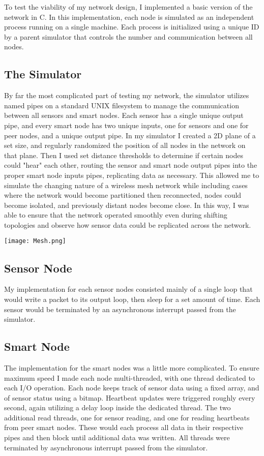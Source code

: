 \documentclass{article}
\begin{document}
To test the viability of my network design, I implemented a basic version of the network in C. In this implementation, each node is simulated as an independent process running on a single machine. Each process is initialized using a unique ID by a parent simulator that controls the number and communication between all nodes.

\subsection{The Simulator}

By far the most complicated part of testing my network, the simulator utilizes named pipes on a standard UNIX filesystem to manage the communication between all sensors and smart nodes. Each sensor has a single unique output pipe, and every smart node has two unique inputs, one for sensors and one for peer nodes, and a unique output pipe. In my simulator I created a 2D plane of a set size, and regularly randomized the position of all nodes in the network on that plane. Then I used set distance thresholds to determine if certain nodes could "hear" each other, routing the sensor and smart node output pipes into the proper smart node inputs pipes, replicating data as necessary. This allowed me to simulate the changing nature of a wireless mesh network while including cases where the network would become partitioned then reconnected, nodes could become isolated, and previously distant nodes become close. In this way, I was able to ensure that the network operated smoothly even during shifting topologies and observe how sensor data could be replicated across the network. 

\texttt{[image: Mesh.png]}

\subsection{Sensor Node}

My implementation for each sensor nodes consisted mainly of a single loop that would write a packet to its output loop, then sleep for a set amount of time. Each sensor would be terminated by an asynchronous interrupt passed from the simulator. 

\subsection{Smart Node}

The implementation for the smart nodes was a little more complicated. To ensure maximum speed I made each node multi-threaded, with one thread dedicated to each I/O operation. Each node keeps track of sensor data using a fixed array, and of sensor status using a bitmap. Heartbeat updates were triggered roughly every second, again utilizing a delay loop inside the dedicated thread. The two additional read threads, one for sensor reading, and one for reading heartbeats from peer smart nodes. These would each process all data in their respective pipes and then block until additional data was written. All threads were terminated by asynchronous interrupt passed from the simulator.
\end{document}
